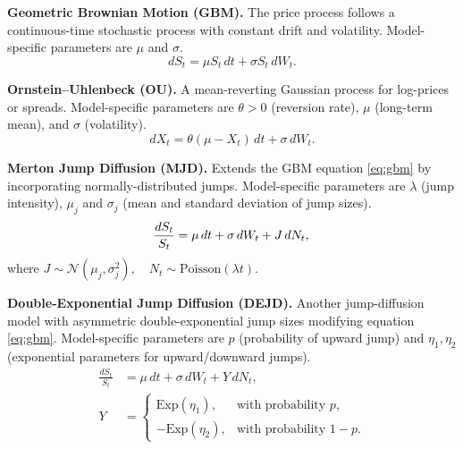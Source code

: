 \documentclass[sigconf]{acmart}
\begin{document}
      \begin{enumerate}[label=\textbf{[A\arabic*]}]
        \item \label{alg:gbm} \textbf{Geometric Brownian Motion 
        (GBM).} 
        The price process follows a continuous-time stochastic 
        process with constant drift and volatility. Model-specific 
        parameters are \(\mu\) and \(\sigma\).
        \begin{equation}
        dS_t = \mu S_t\,dt + \sigma S_t\,dW_t.
        \label{eq:gbm}
        \end{equation}

        \item \label{alg:ou} \textbf{Ornstein–Uhlenbeck (OU).} 
        A mean-reverting Gaussian process for log-prices or 
        spreads. Model-specific parameters are \(\theta>0\) 
        (reversion rate), \(\mu\) (long-term mean), and \(\sigma\) 
        (volatility).
        \begin{equation}
        dX_t = \theta(\mu - X_t)\,dt + \sigma\,dW_t.
        \end{equation}

        \item \label{alg:mjd} \textbf{Merton Jump Diffusion (MJD).} 
        Extends the GBM equation \eqref{eq:gbm} by incorporating 
        normally-distributed jumps. 
        Model-specific parameters are \(\lambda\) (jump intensity), 
        \(\mu_j\) and \(\sigma_j\) (mean and standard deviation of 
        jump sizes).
        \begin{equation}
        \frac{dS_t}{S_t} = \mu\,dt + \sigma\,dW_t + J\,dN_t,\\
        \end{equation}
        where $J \sim \mathcal N(\mu_j, \sigma_j^2),\quad N_t\sim\mathrm{Poisson}(\lambda t)$.


        \item \label{alg:dejd} \textbf{Double-Exponential Jump 
        Diffusion (DEJD).} 
        Another jump-diffusion model with asymmetric double-exponential 
        jump sizes modifying equation \eqref{eq:gbm}. 
        Model-specific parameters are \(p\) 
        (probability of upward jump) and \(\eta_1, \eta_2\) 
        (exponential parameters for upward/downward jumps).
        \begin{align}
          \frac{dS_t}{S_t} &= \mu\,dt + \sigma\,dW_t + Y\,dN_t,\\
          Y &=
          \begin{cases}
          \mathrm{Exp}(\eta_1), &\text{with probability } p,\\[4pt]
          -\mathrm{Exp}(\eta_2), &\text{with probability } 1-p.
          \end{cases} \nonumber
        \end{align}


\end{enumerate}
\end{document}

